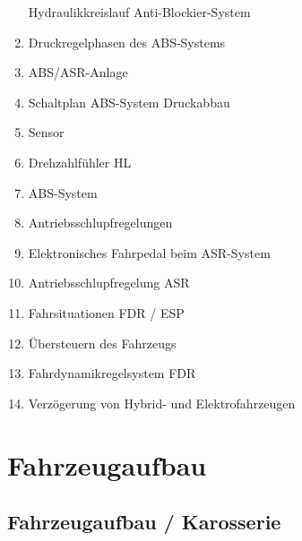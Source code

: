 \begin{enumerate}
  Hydraulikkreislauf Anti-Blockier-System\\
\item
  Druckregelphasen des ABS-Systems\\
\item
  ABS/ASR-Anlage\\
\item
  Schaltplan ABS-System Druckabbau\\
\item
  Sensor\\
\item
  Drehzahlfühler HL\\
\item
  ABS-System\\
\item
  Antriebsschlupfregelungen\\
\item
  Elektronisches Fahrpedal beim ASR-System\\
\item
  Antriebsschlupfregelung ASR\\
\item
  Fahrsituationen FDR / ESP\\
\item
  Übersteuern des Fahrzeugs\\
\item
  Fahrdynamikregelsystem FDR\\
\item
  Verzögerung von Hybrid- und Elektrofahrzeugen
\end{enumerate}

\section{Fahrzeugaufbau}\label{fahrzeugaufbau}

\subsection{Fahrzeugaufbau /
Karosserie}\label{fahrzeugaufbau-karosserie}

